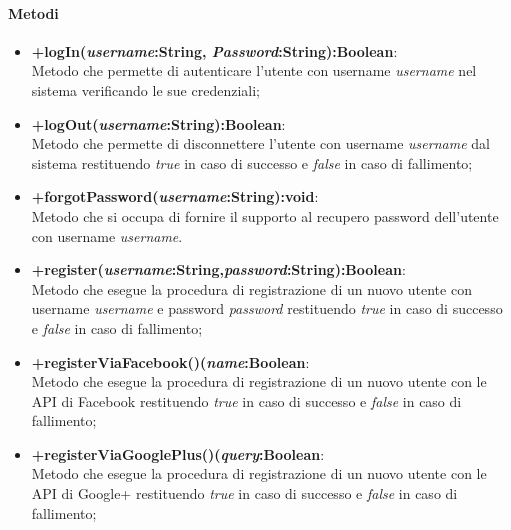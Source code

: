 	\paragraph{Metodi}
	\begin{itemize}
	  	\item \textbf{+logIn(\textit{username}:String, \textit{Password}:String):Boolean}:\\
		 	Metodo che permette di autenticare l'utente con username \textit{username} nel sistema verificando le sue credenziali;
	  	\item \textbf{+logOut(\textit{username}:String):Boolean}:\\
		  	Metodo che permette di disconnettere l'utente con username \textit{username} dal sistema restituendo \textit{true} in caso di successo e \textit{false} in caso di fallimento;
	  	\item \textbf{+forgotPassword(\textit{username}:String):void}:\\
		  	Metodo che si occupa di fornire il supporto al recupero password dell'utente con username \textit{username}.
	   	\item \textbf{+register(\textit{username}:String,\textit{password}:String):Boolean}:\\
	  		Metodo che esegue la procedura di registrazione di un nuovo utente con username \textit{username} e password \textit{password} restituendo \textit{true} in caso di successo e \textit{false} in caso di fallimento;
	  	\item \textbf{+registerViaFacebook()(\textit{name}:Boolean}:\\
	  		 Metodo che esegue la procedura di registrazione di un nuovo utente con le API di Facebook restituendo \textit{true} in caso di successo e \textit{false} in caso di fallimento;
	  	\item \textbf{+registerViaGooglePlus()(\textit{query}:Boolean}:\\
	  		 Metodo che esegue la procedura di registrazione di un nuovo utente con le API di Google+ restituendo \textit{true} in caso di successo e \textit{false} in caso di fallimento;
	\end{itemize}
